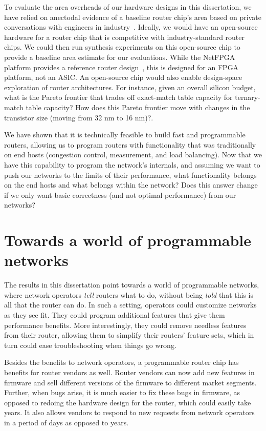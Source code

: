  To evaluate the area
overheads of our hardware designs in this dissertation, we have relied on
anectodal evidence of a baseline router chip's area based on private conversations with
engineers in industry~\cite{gibb_parsing}. Ideally, we would have an
open-source hardware for a router chip that is competitive with
industry-standard router chips. We could then run synthesis experiments
on this open-source chip to provide a baseline area estimate for our evaluations. While the NetFPGA
platform provides a reference router design~\cite{netfpga}, this is designed
for an FPGA platform, not an ASIC. An open-source chip would also enable design-space
exploration of router architectures. For instance, given an overall silicon
budget, what is the Pareto frontier that trades off exact-match table capacity
for ternary-match table capacity? How does this Pareto frontier move with
changes in the transistor size (\eg moving from 32 nm to 16 nm)?.

 We have shown
that it is technically feasible to build fast and programmable routers,
allowing us to program routers with functionality that was traditionally on end
hosts (\eg congestion control, measurement, and load balancing). Now
that we have this capability to program the network's internals, and assuming
we want to push our networks to the limits of their performance, what
functionality belongs on the end hosts and what belongs within
the network?  Does this answer change if we only want basic correctness (and
not optimal performance) from our networks?

\section{Towards a world of programmable networks}

The results in this dissertation point towards a world of programmable
networks, where network operators \textit{tell} routers what to do, without
being \textit{told} that this is all that the router can do. In such a setting,
operators could customize networks as they see fit.  They could program
additional features that give them performance benefits.  More interestingly,
they could remove needless features from their router, allowing them to
simplify their routers' feature sets, which in turn could ease troubleshooting
when things go wrong.

Besides the benefits to network operators, a programmable router chip has
benefits for router vendors as well. Router vendors can now add new features in
firmware and sell different versions of the firmware to different market
segments. Further, when bugs arise, it is much easier to fix these bugs in
firmware, as opposed to redoing the hardware design for the router, which could
easily take years. It also allows vendors to respond to new requests from
network operators in a period of days as opposed to years.

